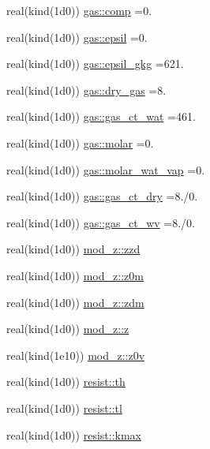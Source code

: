 \begin{DoxyCompactItemize}
\item 
real(kind(1d0)) \hyperlink{namespacegas_a8d2291490d8d94a5eb49100ffd378b26}{gas\+::comp} =0.
\item 
real(kind(1d0)) \hyperlink{namespacegas_afa96177c3b1c55a70edf05810d52f9f0}{gas\+::epsil} =0.
\item 
real(kind(1d0)) \hyperlink{namespacegas_adba3767a875b8f50cfbb3e846eecb0fa}{gas\+::epsil\+\_\+gkg} =621.
\item 
real(kind(1d0)) \hyperlink{namespacegas_a380e25a8b858b684637ee899e03d39fe}{gas\+::dry\+\_\+gas} =8.
\item 
real(kind(1d0)) \hyperlink{namespacegas_a5d7564fea612b3867805c157aff8acae}{gas\+::gas\+\_\+ct\+\_\+wat} =461.
\item 
real(kind(1d0)) \hyperlink{namespacegas_a32b7a8a8aa0b674522c67d4cec42218f}{gas\+::molar} =0.
\item 
real(kind(1d0)) \hyperlink{namespacegas_ad10ab34d9d4d2e261f87f013d3822774}{gas\+::molar\+\_\+wat\+\_\+vap} =0.
\item 
real(kind(1d0)) \hyperlink{namespacegas_ac0aae13e9168fcb9f0f09f3559594b4d}{gas\+::gas\+\_\+ct\+\_\+dry} =8./0.
\item 
real(kind(1d0)) \hyperlink{namespacegas_af2886584ed51b7aeb801840825049d91}{gas\+::gas\+\_\+ct\+\_\+wv} =8./0.
\item 
real(kind(1d0)) \hyperlink{namespacemod__z_ac1314dbe1ed7b4c92c501ced67f725c3}{mod\+\_\+z\+::zzd}
\item 
real(kind(1d0)) \hyperlink{namespacemod__z_afd15a8bab419b8b576ccd3fa639d546f}{mod\+\_\+z\+::z0m}
\item 
real(kind(1d0)) \hyperlink{namespacemod__z_a85318ac2a4eb1313fc10432ff860214e}{mod\+\_\+z\+::zdm}
\item 
real(kind(1d0)) \hyperlink{namespacemod__z_a64eb68f633930155dd1415ee7f3e9d5c}{mod\+\_\+z\+::z}
\item 
real(kind(1e10)) \hyperlink{namespacemod__z_a62697e7e7a6c6a41258386a4a26ec1a7}{mod\+\_\+z\+::z0v}
\item 
real(kind(1d0)) \hyperlink{namespaceresist_a4a4f565342a527412998f585a5c126be}{resist\+::th}
\item 
real(kind(1d0)) \hyperlink{namespaceresist_ac5a785e8c6079704fe779baff78c5c54}{resist\+::tl}
\item 
real(kind(1d0)) \hyperlink{namespaceresist_ab582d1ab5eac071afaba0e8b351311ff}{resist\+::kmax}
\item 

\end{DoxyCompactItemize}
